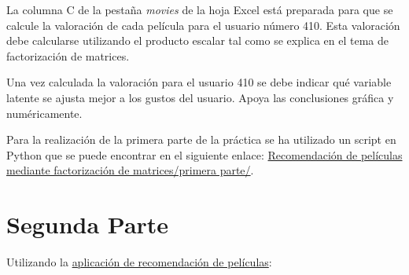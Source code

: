 \documentclass{uimppracticas}
\begin{document}
La columna C de la pestaña \textit{movies} de la hoja Excel está preparada para que se calcule la valoración de cada película para el usuario número 410. Esta valoración debe calcularse utilizando el producto escalar tal como se explica en el tema de factorización de matrices.

Una vez calculada la valoración para el usuario 410 se debe indicar qué variable latente se ajusta mejor a los gustos del usuario. Apoya las conclusiones gráfica y numéricamente. 


Para la realización de la primera parte de la práctica se ha utilizado un script en Python que se puede encontrar en el siguiente enlace: \href{https://github.com/lrodrin/masterAI/tree/master/A13/Recomendaci%C3%B3n%20de%20pel%C3%ADculas%20mediante%20factorizaci%C3%B3n%20de%20matrices/primera%20parte}{Recomendación de películas mediante factorización de matrices/primera parte/}.

\newpage

\section*{Segunda Parte}

Utilizando la \href{https://poliformat.upv.es/access/content/group/ESP_0_2827/Movielens.zip}{aplicación de recomendación de películas}:
\end{document}
